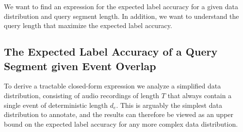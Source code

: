 We want to find an expression for the expected label accuracy for a given data distribution and query segment length. In addition, we want to understand the query length that maximize the expected label accuracy.


\subsection{The Expected Label Accuracy of a Query Segment given Event Overlap}
\label{sec:expected_label_accuracy_given_overlap}

To derive a tractable closed-form expression we analyze a simplified data distribution, consisting of audio recordings of length $T$ that always contain a single event of deterministic length $d_e$. This is arguably the simplest data distribution to annotate, and the results can therefore be viewed as an upper bound on the expected label accuracy for any more complex data distribution. %


